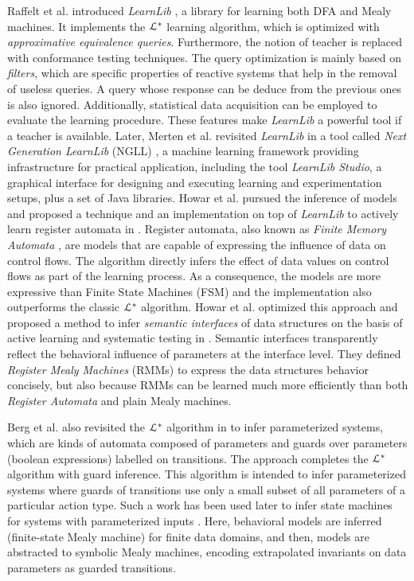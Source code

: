 Raffelt et al. introduced \textit{LearnLib}
\cite{Raffelt:2005:LLA:1081180.1081189}, a library for learning
both DFA and Mealy machines. It implements the $\EuScript{L}^*$
\cite{Angluin198787} learning algorithm, which is optimized with
\textit{approximative equivalence queries}. Furthermore, the
notion of teacher is replaced with conformance testing
techniques. The query optimization is mainly based on
\textit{filters}, which are specific properties of reactive
systems that help in the removal of useless queries. A query
whose response can be deduce from the previous ones is also
ignored. Additionally, statistical data acquisition can be
employed to evaluate the learning procedure. These features make
\textit{LearnLib} a powerful tool if a teacher is available.
Later, Merten et al. revisited \textit{LearnLib} in a tool called
\textit{Next Generation LearnLib} (NGLL) \cite{ngll11}, a machine
learning framework providing infrastructure for practical
application, including the tool \textit{LearnLib Studio}, a
graphical interface for designing and executing learning and
experimentation setups, plus a set of Java libraries. Howar et
al. pursued the inference of models  and proposed a technique and
an implementation on top of \textit{LearnLib} to actively learn
register automata in \cite{howarRA2012}. Register automata, also
known as \textit{Finite Memory Automata} \cite{Kaminski1994329},
are models that are capable of expressing the influence of data
on control flows. The algorithm directly infers the effect of
data values on control flows as part of the learning process. As
a consequence, the models are more expressive than Finite State
Machines (FSM) and the implementation also  outperforms the
classic $\EuScript{L}^*$ algorithm. Howar et al. optimized this
approach and proposed a method to infer \textit{semantic
interfaces} of data structures on the basis of active learning
and systematic testing in \cite{howar2012}. Semantic interfaces
transparently reflect the behavioral influence of parameters at
the interface level.  They defined \textit{Register Mealy
Machines} (RMMs) to express the data structures behavior
concisely, but also because RMMs can be learned much more
efficiently than both \textit{Register Automata} and plain Mealy
machines.

Berg et al. also revisited the $\EuScript{L}^*$ algorithm in
\cite{regularinfBerg06} to infer parameterized systems, which are
kinds of automata composed of parameters and guards over
parameters (boolean expressions) labelled on transitions. The
approach completes the  $\EuScript{L}^*$ algorithm with guard
inference. This algorithm is intended to infer parameterized
systems where guards of transitions use only a small subset of
all parameters of a particular action type. Such a work has been
used later to infer state machines for systems with parameterized
inputs \cite{regularinfBerg08}. Here, behavioral models are
inferred (finite-state Mealy machine) for finite data domains,
and then, models are abstracted to symbolic Mealy machines,
encoding extrapolated invariants on data parameters as guarded
transitions.

